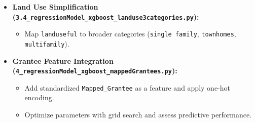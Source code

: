 \begin{itemize}
    \item \textbf{Land Use Simplification (\texttt{3.4\_regressionModel\_xgboost\_landuse3categories.py}):}
    \begin{itemize}
        \item Map \texttt{landuseful} to broader categories (\texttt{single family}, \texttt{townhomes}, \texttt{multifamily}).
    \end{itemize}

    \item \textbf{Grantee Feature Integration (\texttt{4\_regressionModel\_xgboost\_mappedGrantees.py}):}
    \begin{itemize}
        \item Add standardized \texttt{Mapped\_Grantee} as a feature and apply one-hot encoding.
        \item Optimize parameters with grid search and assess predictive performance.
    \end{itemize}
\end{itemize}
